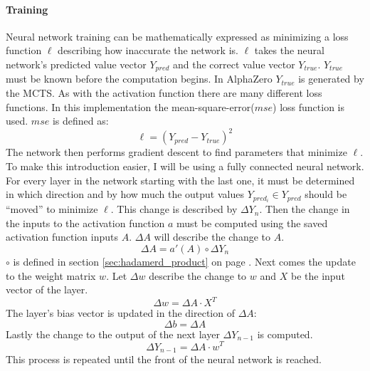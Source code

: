 \documentclass[12pt]{article}
\newcommand{\sectionref}[1]{section \ref{#1} on page \pageref{#1}}
\begin{document}
\paragraph{Training} 
Neural network training can be mathematically expressed as minimizing a loss function  \(\ell\) describing how inaccurate the network is. \(\ell\) takes the neural network's predicted value vector \(Y_{pred}\) and the correct value vector \(Y_{true}\). \(Y_{true}\) must be known before the computation begins. In AlphaZero \(Y_{true}\) is generated by the MCTS. As with the activation function there are many different loss functions. In this implementation the mean-square-error(\(mse\)) loss function is used. \(mse\) is defined as:
\begin{equation} \label{eq:NN:loss_mse}
\ell = (Y_{pred} - Y_{true})^2
\end{equation}
The network then performs gradient descent to find parameters that minimize \(\ell\). To make this introduction easier, I will be using a fully connected neural network. For every layer in the network starting with the last one, it must be determined in which direction and by how much the output values \(Y_{pred_i} \in Y_{pred}\) should be ``moved'' to minimize \(\ell\). This change is described by \(\Delta Y_n\). Then the change in the inputs to the activation function \(a\) must be computed using the saved activation function inputs \(A\). \(\Delta A\) will describe the change to \(A\).
\begin{equation}\label{eq:NN:deltaA}
\Delta A = a'(A) \circ \Delta Y_n
\end{equation}
\(\circ\) is defined in \sectionref{sec:hadamerd_product}.
Next comes the update to the weight matrix \(w\). Let \(\Delta w\) describe the change to \(w\) and \(X\) be the input vector of the layer.
\begin{equation}\label{eq:NN:deltaW}
\Delta w = \Delta A \cdot X^T
\end{equation}
The layer's bias vector is updated in the direction of \(\Delta A\):
\begin{equation}\label{eq:NN:deltaB}
\Delta b = \Delta A
\end{equation}
Lastly the change to the output of the next layer \(\Delta Y_{n-1}\) is computed.
\begin{equation} \label{eq:NN:deltaA_lastLayer}
\Delta Y_{n-1} = \Delta A \cdot w^T
\end{equation}
This process is repeated until the front of the neural network is reached.
\end{document}
